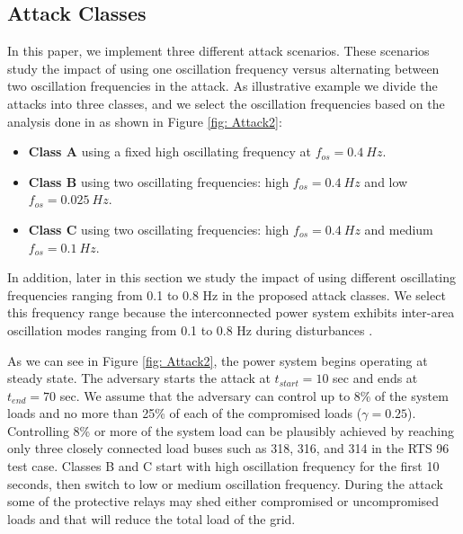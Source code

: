 \documentclass[journal]{IEEEtran}
\begin{document}
\subsection{Attack Classes}
In this paper, we implement three different attack scenarios. These scenarios study the impact of using one oscillation frequency versus alternating between two oscillation frequencies in the attack. As illustrative example we divide the attacks into three classes, and we select the oscillation frequencies based on the analysis done in \cite{Anu,carter} as shown in  Figure \ref{fig: Attack2}: 



\begin{itemize}
  \item \textbf{Class A} using a fixed high oscillating frequency at $f_{os}=0.4~ Hz$. 
  \item \textbf{Class B} using two oscillating frequencies: high $f_{os}=0.4~ Hz$ and low $f_{os}=0.025 ~Hz$. 
  \item \textbf{Class C} using two oscillating frequencies: high $f_{os}=0.4~ Hz$ and medium $f_{os}=0.1 ~Hz$.
\end{itemize}
In addition, later in this section we study the impact of using different oscillating frequencies ranging from 0.1 to 0.8 Hz in the proposed attack classes. We select this frequency range because the interconnected power system exhibits inter-area oscillation modes ranging from 0.1 to 0.8 Hz during disturbances \cite{interarea,OSC2,OSC}.

As we can see in Figure \ref{fig: Attack2}, the power system begins operating at steady state. The adversary starts the attack at $t_{start} = 10$ sec and ends at $t_{end} = 70$ sec. We assume that the adversary can control up to 8\% of the system loads and no more than 25\% of each of the compromised loads ($ \gamma = 0.25$). Controlling 8\% or more of the system load can be plausibly achieved by reaching only three closely connected load buses \textemdash such as 318, 316, and 314 \textemdash in the RTS 96 test case. Classes B and C start with high oscillation frequency for the first 10 seconds, then switch to low or medium oscillation frequency. During the attack some of the protective relays may shed either compromised or uncompromised loads and that will reduce the total load of the grid. 

\end{document}

